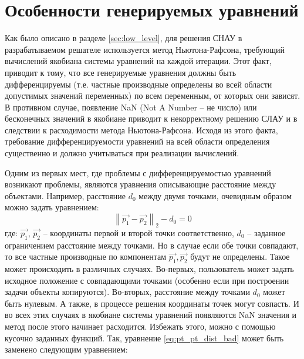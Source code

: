 \section{Особенности генерируемых уравнений}

Как было описано в разделе \ref{sec:low_level}, для решения СНАУ в разрабатываемом решателе используется метод Ньютона-Рафсона, требующий вычислений якобиана системы уравнений на каждой итерации. Этот факт, приводит к тому, что все генерируемые уравнения должны быть дифференцируемы (т.е. частные производные определены во всей области допустимых значений переменных) по всем переменным, от которых они зависят. В противном случае, появление NaN (Not A Number -- не число) или бесконечных значений в якобиане приводит к некорректному решению СЛАУ и в следствии к расходимости метода Ньютона-Рафсона. Исходя из этого факта, требование дифференцируемости  уравнений на всей области определения существенно и должно учитываться при реализации вычислений. 

Одним из первых мест, где проблемы с дифференцируемостью уравнений возникают проблемы, являются уравнения описывающие расстояние между объектами. Например, расстояние $d_0$ между двумя точками, очевидным образом можно задать уравнением:
\begin{equation}\label{eq:pt_pt_dist_bad}
   \left \|  \Vec{p_1} - \Vec{p_2} \right \|_2 - d_0 = 0
\end{equation}
где: $\Vec{p_1}$, $\Vec{p_2}$ -- координаты первой и второй точки соответственно, $d_0$ -- заданное ограничением расстояние между точками. Но в случае если обе точки совпадают, то все частные производные по компонентам $\Vec{p_1}, \Vec{p_2}$ будут не определены. Такое может происходить в различных случаях. Во-первых, пользователь может задать исходное положение с совпадающими точками (особенно если при построении задачи объекты копируются). Во-вторых, расстояние между точками $d_0$ может быть нулевым. А также, в процессе решения координаты точек могут совпасть. И во всех этих случаях в якобиане системы уравнений появляются NaN значения и метод после этого начинает расходится. Избежать этого, можно с помощью кусочно заданных функций. Так, уравнение \ref{eq:pt_pt_dist_bad} может быть заменено следующим уравнением:


